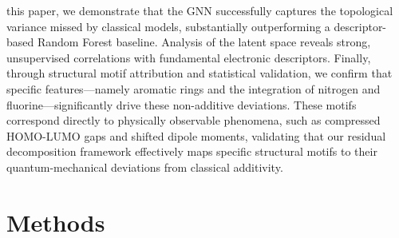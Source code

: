 \documentclass[]{article}
\begin{document}
this paper, we demonstrate that the GNN successfully captures the topological variance missed by classical models, substantially outperforming a descriptor-based Random Forest baseline. \citep{shui2020heterogeneousmoleculargraphneural,liu2021fastquantumpropertyprediction,rittig2022graphneuralnetworksprediction} Analysis of the latent space reveals strong, unsupervised correlations with fundamental electronic descriptors. \citep{lu2019molecularpropertypredictionmultilevel,liu2021fastquantumpropertyprediction,arjonamedina2024analysisatomlevelpretrainingquantum} Finally, through structural motif attribution and statistical validation, we confirm that specific features—namely aromatic rings and the integration of nitrogen and fluorine—significantly drive these non-additive deviations. \citep{shui2020heterogeneousmoleculargraphneural,wang2022motifbasedgraphrepresentationlearning,yu2025magemodellevelgraphneural} These motifs correspond directly to physically observable phenomena, such as compressed HOMO-LUMO gaps and shifted dipole moments, validating that our residual decomposition framework effectively maps specific structural motifs to their quantum-mechanical deviations from classical additivity. \citep{lu2019molecularpropertypredictionmultilevel,shui2020heterogeneousmoleculargraphneural,liu2021fastquantumpropertyprediction}

\section{Methods}
\label{sec:methods}
\end{document}
